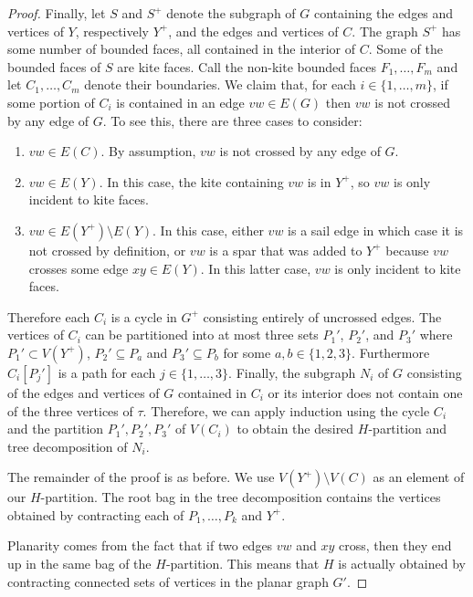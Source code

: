 \documentclass{patmorin}
\begin{document}
\begin{proof}
  
  Finally, let $S$ and $S^+$ denote the subgraph of $G$ containing the edges and vertices of $Y$, respectively $Y^+$, and the edges and vertices of $C$.  The graph $S^+$ has some number of bounded faces, all contained in the interior of $C$. Some of the bounded faces of $S$ are kite faces. Call the non-kite bounded faces $F_1,\ldots,F_m$ and let $C_1,\ldots,C_m$ denote their boundaries.  We claim that, for each $i\in\{1,\ldots,m\}$, if some portion of $C_i$ is contained in an edge $vw\in E(G)$ then $vw$ is not crossed by any edge of $G$.  To see this, there are three cases to consider:
  \begin{enumerate}
    \item $vw\in E(C)$. By assumption, $vw$ is not crossed by any edge of $G$.
    \item $vw\in E(Y)$. In this case, the kite containing $vw$ is in $Y^+$, so $vw$ is only incident to kite faces.
    \item $vw\in E(Y^+)\setminus E(Y)$. In this case, either $vw$ is a sail edge in which case it is not crossed by definition, or $vw$ is a spar that was added to $Y^+$ because $vw$ crosses some edge $xy\in E(Y)$.  In this latter case, $vw$ is only incident to kite faces.
  \end{enumerate}
  Therefore each $C_i$ is a cycle in $G^+$ consisting entirely of uncrossed edges. The vertices of $C_i$ can be partitioned into at most three sets $P_1'$, $P_2'$, and $P_3'$ where $P_1'\subset V(Y^+)$, $P_2'\subseteq P_a$ and $P_3'\subseteq P_b$ for some $a,b\in\{1,2,3\}$. Furthermore $C_i[P_j']$ is a path for each $j\in\{1,\ldots,3\}$. Finally, the subgraph $N_i$ of $G$ consisting of the edges and vertices of $G$ contained in $C_i$ or its interior does not contain one of the three vertices of $\tau$. Therefore, we can apply induction using the cycle $C_i$ and the partition $P_1',P_2',P_3'$ of $V(C_i)$ to obtain the desired $H$-partition and tree decomposition of $N_i$.
  
  The remainder of the proof is as before. We use $V(Y^+)\setminus V(C)$ as an element of our $H$-partition.  The root bag in the tree decomposition contains the vertices obtained by contracting each of $P_1,\ldots,P_k$ and $Y^+$.
  
  Planarity comes from the fact that if two edges $vw$ and $xy$ cross, then they end up in the same bag of the $H$-partition.  This means that $H$ is actually obtained by contracting connected sets of vertices in the planar graph $G'$.
\end{proof}
\end{document}
